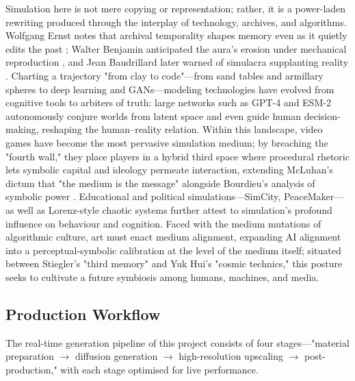 \documentclass[sigconf,nonacm]{acmart}
\begin{document}
Simulation here is not mere copying or representation; rather, it is a power-laden rewriting produced through the interplay of technology, archives, and algorithms. Wolfgang Ernst notes that archival temporality shapes memory even as it quietly edits the past \citep{Ernst_Archive}; Walter Benjamin anticipated the aura's erosion under mechanical reproduction \citep{Benjamin_WorkOfArt}, and Jean Baudrillard later warned of simulacra supplanting reality \cite{Baudrillard_Simulacra}. Charting a trajectory "from clay to code"—from sand tables and armillary spheres to deep learning and GANs—modeling technologies have evolved from cognitive tools to arbiters of truth: large networks such as GPT-4 and ESM-2 autonomously conjure worlds from latent space and even guide human decision-making, reshaping the human–reality relation. Within this landscape, video games have become the most pervasive simulation medium; by breaching the "fourth wall," they place players in a hybrid third space where procedural rhetoric lets symbolic capital and ideology permeate interaction, extending McLuhan's dictum that "the medium is the message" \cite{McLuhan_UnderstandingMedia} alongside Bourdieu's analysis of symbolic power \cite{Bourdieu_SymbolicPower}. Educational and political simulations—SimCity, PeaceMaker—as well as Lorenz-style chaotic systems further attest to simulation's profound influence on behaviour and cognition. Faced with the medium mutations of algorithmic culture, art must enact medium alignment, expanding AI alignment into a perceptual-symbolic calibration at the level of the medium itself; situated between Stiegler's "third memory" \cite{Stiegler_TechnicsTime1} and Yuk Hui's "cosmic technics," \cite{Hui_Cosmotechnics} this posture seeks to cultivate a future symbiosis among humans, machines, and media.



\subsection{Production Workflow}
The real-time generation pipeline of this project consists of four stages—"material preparation $\rightarrow$ diffusion generation $\rightarrow$ high-resolution upscaling $\rightarrow$ post-production," with each stage optimised for live performance.
\end{document}
